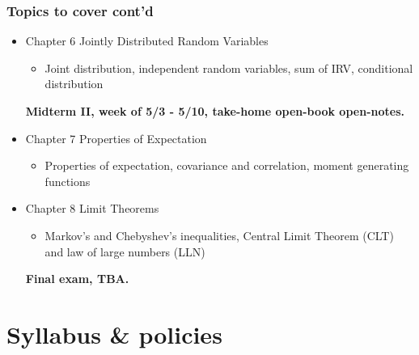 \documentclass[slidestop,compress,mathserif]{beamer}
\begin{document}
\begin{frame}\frametitle{Topics to cover cont'd}
\begin{itemize}

\item Chapter 6 Jointly Distributed Random Variables
\begin{itemize}
\item Joint distribution, independent random variables, sum of IRV,
conditional distribution
\end{itemize}

{\bf \large {\color{VassarRed}Midterm II, week of 5/3 - 5/10, take-home open-book open-notes.}}

\pause


\item Chapter 7 Properties of Expectation
\begin{itemize}
\item Properties of expectation, covariance and correlation, moment
generating functions
\end{itemize}


\item Chapter 8 Limit Theorems
\begin{itemize}
\item Markov's and Chebyshev's inequalities, Central Limit Theorem (CLT)
and law of large numbers (LLN)
\end{itemize}

{\bf \large {\color{VassarRed}Final exam, TBA.}}

\end{itemize}

\end{frame}




\section{Syllabus \& policies}
\end{document}
